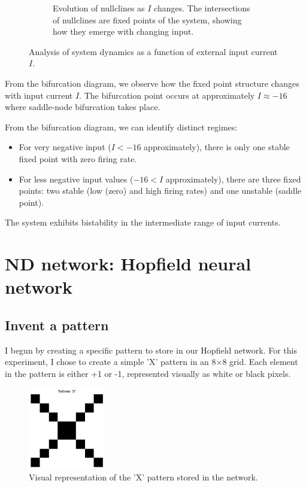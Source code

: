 \documentclass{article}
\begin{document}
\begin{figure}[H]
\begin{subfigure}{0.48\textwidth}
        \caption{Evolution of nullclines as $I$ changes. The intersections of nullclines are fixed points of the system, showing how they emerge with changing input.}
        \label{fig:nullcline_evolution}
    \end{subfigure}
    \caption{Analysis of system dynamics as a function of external input current $I$.}
    \label{fig:bifurcation_analysis_combined}
\end{figure}

\bigskip
From the bifurcation diagram, we observe how the fixed point structure changes with input current $I$. The bifurcation point occurs at approximately $I \approx -16$ where saddle-node bifurcation takes place.


From the bifurcation diagram, we can identify distinct regimes:
\begin{itemize}
    \item For very negative input ($I < -16$ approximately), there is only one stable fixed point with zero firing rate.
    \item For less negative input values ($-16 < I $ approximately), there are three fixed points: two stable (low (zero) and high firing rates) and one unstable (saddle point).

\end{itemize}

The system exhibits bistability in the intermediate range of input currents. 




\section{ND network: Hopfield neural network}


\subsection{Invent a pattern}

I begun by creating a specific pattern to store in our Hopfield network. For this experiment, I chose to create a simple 'X' pattern in an 8×8 grid. Each element in the pattern is either +1 or -1, represented visually as white or black pixels.

\begin{figure}[H]
\centering
\includegraphics[width=0.3\textwidth]{Pattern 'X'.png}
\caption{Visual representation of the 'X' pattern stored in the network.}
\label{fig:pattern}
\end{figure}
\end{document}

